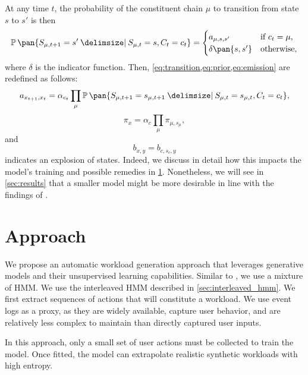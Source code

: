 At any time \(t\), the probability of the constituent chain \(\mu\) to transition from state \(s\) to \(s'\) is then
\begin{equation}
    \prob\pan{S_{\mu,t+1} = s' \giv S_{\mu,t} = s, C_t = c_t} = \begin{cases}
        a_{\mu,s,s'} & \text{if $c_t = \mu$,} \\
        \delta\pan{s, s'} & \text{otherwise,} \\
    \end{cases}
\end{equation}
where \(\delta\) is the indicator function.
Then, \cref{eq:transition,eq:prior,eq:emission} are redefined as follows:
\begin{equation}\label{eq:interleaved_transition}
    \begin{multlined}
        a_{x_{t+1}, x_t} =
        \alpha_{c_t}\prod_{\mu} \prob\pan{S_{\mu,t+1} = s_{\mu,t+1} \giv S_{\mu,t} = s_{\mu,t}, C_t = c_t},
    \end{multlined}
\end{equation}
\begin{equation}
    \pi_x = \alpha_c \prod_\mu \pi_{\mu,s_\mu},
\end{equation}
and
\begin{equation}
    b_{x,y} = b_{c,s_c,y}
\end{equation}
 indicates an explosion of states. Indeed, we discuss in detail how this impacts the model's training and possible remedies in \cref{sec:approach}. Nonetheless, we will see in \cref{sec:results} that a smaller model might be more desirable in line with the findings of \cite{Cohen2005-mn}.

\section{Approach}\label{sec:approach}

We propose an automatic workload generation approach that leverages generative models and their unsupervised learning capabilities. Similar to \cite{Yadwadkar2010-ml}, we use a mixture of HMM. We use the interleaved HMM described in \cref{sec:interleaved_hmm}. We first extract sequences of actions that will constitute a workload. We use event logs as a proxy, as they are widely available, capture user behavior, and are relatively less complex to maintain than directly captured user inputs.

In this approach, only a small set of user actions must be collected to train the model. Once fitted, the model can extrapolate realistic synthetic workloads with high entropy.

